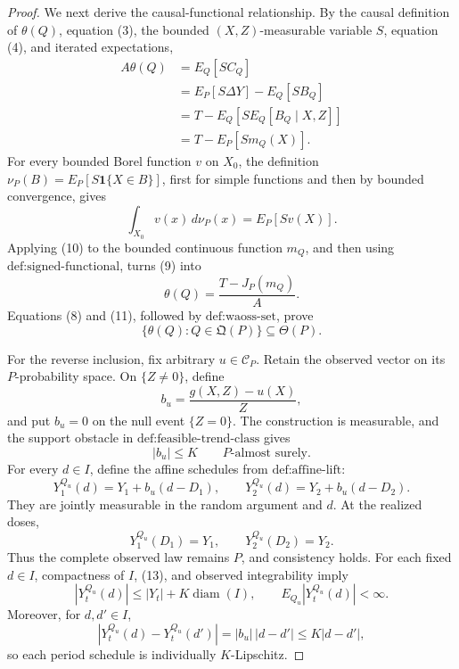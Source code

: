 \documentclass{article}
\begin{document}
\begin{proof}
We next derive the causal-functional relationship. By the causal definition of \(\theta(Q)\), equation (3), the bounded \((X,Z)\)-measurable variable \(S\), equation (4), and iterated expectations,
\[
\begin{aligned}
A\theta(Q)
&=E_Q[SC_Q]\\
&=E_P[S\Delta Y]-E_Q[SB_Q]\\
&=T-E_Q\!\left[S E_Q[B_Q\mid X,Z]\right]\\
&=T-E_P[Sm_Q(X)].
\end{aligned} \tag{9}
\]
For every bounded Borel function \(v\) on \(X_0\), the definition
\(\nu_P(B)=E_P[S\mathbf 1\{X\in B\}]\), first for simple functions and then by bounded convergence, gives
\[
\int_{X_0}v(x)\,d\nu_P(x)=E_P[Sv(X)]. \tag{10}
\]
Applying (10) to the bounded continuous function \(m_Q\), and then using \(\text{def:signed-functional}\), turns (9) into
\[
\theta(Q)=\frac{T-J_P(m_Q)}{A}. \tag{11}
\]
Equations (8) and (11), followed by \(\text{def:waoss-set}\), prove
\[
\{\theta(Q):Q\in\mathfrak Q(P)\}\subseteq\Theta(P). \tag{12}
\]

For the reverse inclusion, fix arbitrary \(u\in\mathcal C_P\). Retain the observed vector on its \(P\)-probability space. On \(\{Z\neq0\}\), define
\[
b_u=\frac{g(X,Z)-u(X)}{Z},
\]
and put \(b_u=0\) on the null event \(\{Z=0\}\). The construction is measurable, and the support obstacle in \(\text{def:feasible-trend-class}\) gives
\[
|b_u|\leq K
\qquad P\text{-almost surely}. \tag{13}
\]
For every \(d\in I\), define the affine schedules from \(\text{def:affine-lift}\):
\[
Y_1^{Q_u}(d)=Y_1+b_u(d-D_1),
\qquad
Y_2^{Q_u}(d)=Y_2+b_u(d-D_2). \tag{14}
\]
They are jointly measurable in the random argument and \(d\). At the realized doses,
\[
Y_1^{Q_u}(D_1)=Y_1,
\qquad
Y_2^{Q_u}(D_2)=Y_2. \tag{15}
\]
Thus the complete observed law remains \(P\), and consistency holds. For each fixed \(d\in I\), compactness of \(I\), (13), and observed integrability imply
\[
|Y_t^{Q_u}(d)|\leq |Y_t|+K\operatorname{diam}(I),
\qquad
E_{Q_u}|Y_t^{Q_u}(d)|<\infty. \tag{16}
\]
Moreover, for \(d,d'\in I\),
\[
|Y_t^{Q_u}(d)-Y_t^{Q_u}(d')|
=|b_u|\,|d-d'|
\leq K|d-d'|, \tag{17}
\]
so each period schedule is individually \(K\)-Lipschitz.


\end{proof}
\end{document}
